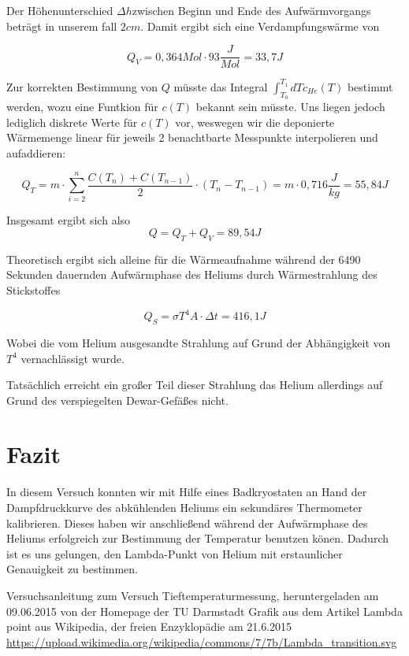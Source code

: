 \documentclass[bigchapter,colorback,accentcolor=tud4b,linedtoc,11pt]{tudreport}
\begin{document}
Der Höhenunterschied $\Delta h$zwischen Beginn und Ende des Aufwärmvorgangs
beträgt in unserem fall $2 cm$. Damit ergibt sich eine Verdampfungswärme von 

$$Q_V = 0,364 Mol \cdot 93\frac{J}{Mol} = 33,7J$$

Zur korrekten Bestimmung von $Q$ müsste das Integral $\int_{T_0}^{T_1}dT
c_{He}(T)$ bestimmt werden, wozu eine Funtkion für $c(T)$ bekannt sein
müsste. Uns liegen jedoch lediglich diskrete Werte für $c(T)$ vor, weswegen wir die
deponierte Wärmemenge linear für jeweils 2 benachtbarte Messpunkte interpolieren
und aufaddieren:

$$Q_T = m \cdot \sum \limits_{i=2}^n \frac{C(T_n) + C(T_{n-1})}{2} \cdot (T_n -
  T_{n-1}) = m \cdot 0,716 \frac{J}{kg} = 55,84 J$$

Insgesamt ergibt sich also 
$$Q = Q_T + Q_V = 89,54J$$

Theoretisch ergibt sich alleine für die Wärmeaufnahme während der 6490 Sekunden
dauernden Aufwärmphase des Heliums durch Wärmestrahlung des Stickstoffes

$$Q_S = \sigma T^4 A \cdot \Delta t = 416,1J$$

Wobei die vom Helium ausgesandte Strahlung auf Grund der Abhängigkeit von $T^4$
vernachlässigt wurde.

Tatsächlich erreicht ein großer Teil dieser Strahlung das Helium allerdings auf
Grund des verspiegelten Dewar-Gefäßes nicht.

\chapter{Fazit}
In diesem Versuch konnten wir mit Hilfe eines Badkryostaten an Hand der
Dampfdruckkurve des abkühlenden Heliums ein sekundäres Thermometer kalibrieren. Dieses haben
wir anschließend während der Aufwärmphase des Heliums erfolgreich zur Bestimmung
der Temperatur benutzen könen. Dadurch ist es uns gelungen, den
Lambda-Punkt von Helium mit erstaunlicher Genauigkeit zu bestimmen.
\cleardoublepage{}
\newpage
\begin{thebibliography}{100}
   Versuchsanleitung zum Versuch Tieftemperaturmessung, heruntergeladen am 09.06.2015 von der Homepage der TU Darmstadt
   Grafik aus dem Artikel Lambda point aus Wikipedia, der freien Enzyklopädie am 21.6.2015 \url{https://upload.wikimedia.org/wikipedia/commons/7/7b/Lambda_transition.svg}
  
\end{thebibliography}
\end{document}
